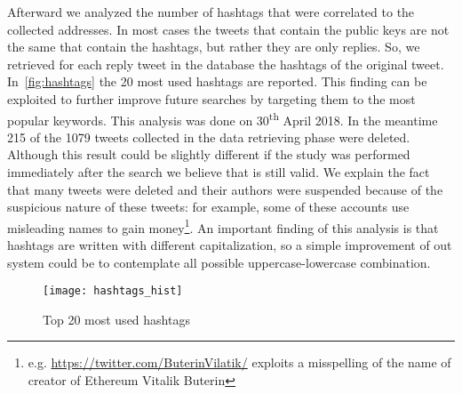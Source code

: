 Afterward we analyzed the number of hashtags that were
correlated to the collected addresses.
In most cases the tweets that
contain the public keys are not the same that contain the hashtags, but rather
they are only replies.
So, we retrieved for each reply tweet in the database the hashtags of the
original tweet.
In~\autoref{fig:hashtags} the 20 most used hashtags are reported.
This finding can be exploited to further improve future searches by targeting
them to the most popular keywords.
This analysis was done on 30\textsuperscript{th} April 2018. In the
meantime 215 of the 1079 tweets collected in the data retrieving phase were
deleted. Although
this result could be slightly different if the study was performed immediately
after the search we believe that is still valid. 
We explain the fact
that many tweets were deleted and their authors were suspended because of
the suspicious nature of these tweets: for example, some of 
these accounts use misleading names to gain
money\footnote{e.g. \url{https://twitter.com/ButerinVilatik/} exploits a
misspelling of the name of creator of Ethereum Vitalik Buterin}.
An important finding of this analysis is that hashtags are written with
different capitalization, so a simple improvement of out system could be to
contemplate all possible uppercase-lowercase combination.

\begin{figure}
\centering
\texttt{[image: hashtags\_hist]}
\caption{Top 20 most used hashtags}
\label{fig:hashtags}
\end{figure}
